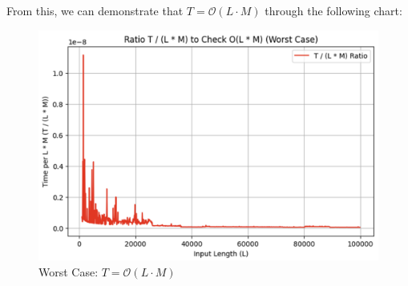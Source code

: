 \newpage

From this, we can demonstrate that $T = \mathcal{O}(L \cdot M)$  through the following chart:

\begin{figure}[ht]
    \centering
    \includegraphics[width=0.8\linewidth]{Figures/worstcase_prove.png}
    \caption{Worst Case: $T = \mathcal{O}(L \cdot M)$}
    \label{fig:prove_worstcase}
\end{figure}